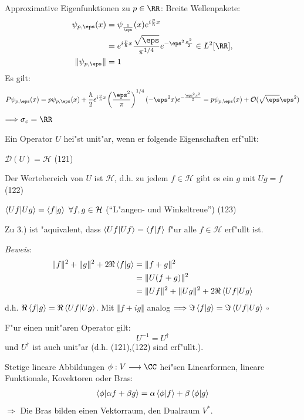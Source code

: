 \documentclass[a4paper]{scrartcl}
\begin{document}
{\begin{1aufz}
Approximative Eigenfunktionen zu $p \in \RR$: Breite Wellenpakete:
\begin{align}
\begin{split}
\psi_{p, \eps}(x) & = \psi_{\frac1\eps}(x) e^{i \frac p \hbar x} \\
& = e^{i \frac p \hbar x } \frac {\sqrt \eps}{\pi^{1/4}} e^{- \eps^2 \frac{x^2}{2}} \in L^2[\RR], \\
\Vert \psi_{p,\eps} \Vert & = 1
\end{split}
\end{align}
Es gilt:
$$P \psi_{p, \eps}(x) = p \psi_{p, \eps}(x) + \frac \hbar 2 e^{i \frac p \hbar x} \left( \frac {\eps^2} \pi \right)^{1/4} (- \eps^2 x) e^{- \frac {\eps^2 x^2}2} = p \psi_{p,\eps}(x) + \mathcal O( \sqrt \eps \eps^2 )$$
$\Longrightarrow \sigma_c = \RR$
\end{1aufz}
Ein Operator $U$ hei"st unit"ar, wenn er folgende Eigenschaften erf"ullt:
\begin{1aufz}
\item $\displaystyle \mathcal D(U) = \mathcal H$ \hfill{} (121)
\item Der Wertebereich von $U$ ist $\mathcal H$, d.h. zu jedem $f \in \mathcal H$ gibt es ein $g$ mit $Ug = f$ \hfill (122)
\item $\displaystyle \braket{ Uf | Ug } = \braket{ f | g} \ \forall f,g \in \mathcal H$ ("`L"angen- und Winkeltreue"') \hfill (123)
\end{1aufz}
\setcounter{equation}{123}
Zu 3.) ist "aquivalent, dass $\braket{ Uf | Uf} = \braket{ f|f}$ f"ur alle $f \in \mathcal H$ erf"ullt ist.

\emph{Beweis}:
\begin{align*}
\Vert f \Vert^2 + \Vert g \Vert^2 + 2 \Re \braket{ f | g } & = \Vert f + g \Vert^2 \\
& =  \Vert U(f+g) \Vert^2 \\
& =  \Vert Uf \Vert^2 + \Vert Ug \Vert^2 + 2 \Re \braket{ Uf | Ug}
\end{align*}
d.h. $\Re \braket{ f | g } = \Re \braket{ Uf | Ug}$. Mit $\Vert f + ig \Vert$ analog $\Longrightarrow \Im \braket{ f | g } = \Im \braket{ Uf | Ug}$
\hfill $\square$

F"ur einen unit"aren Operator gilt:
$$U^{-1} = U^\dagger$$
und $U^\dagger$ ist auch unit"ar (d.h. (121),(122) sind erf"ullt.).

Stetige lineare Abbildungen $\phi: V \longrightarrow \CC$ hei"sen Linearformen, lineare Funktionale, Kovektoren oder Bras:
\begin{align}
\braket{ \phi | \alpha f + \beta g} = \alpha \braket{ \phi | f} + \beta \braket{ \phi | g}
\end{align}
$\Longrightarrow$ Die Bras bilden einen Vektorraum, den Dualraum $V^*$.

}
\end{document}
